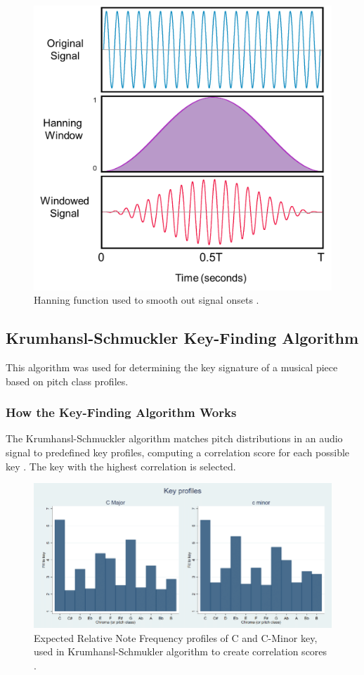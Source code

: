 \documentclass{article}
\begin{document}
\begin{figure}[H]
\includegraphics[width=\textwidth,scale=0.5]{images/hanning.png}
\caption{Hanning function used to smooth out signal onsets \cite{Siemens}.}
\end{figure}

\newpage

\subsection{Krumhansl-Schmuckler Key-Finding Algorithm}
This algorithm was used for determining the key signature of a musical piece based on pitch class profiles.

\subsubsection{How the Key-Finding Algorithm Works}
The Krumhansl-Schmuckler algorithm matches pitch distributions in an audio signal to predefined key profiles, computing a correlation score for each possible key \cite{krumhansl-schmuckler}. The key with the highest correlation is selected.

\begin{figure}[H]
\includegraphics[width=\textwidth,scale=0.5]{images/C-Cminor-Expected-Key-Profiles.png}
\caption{Expected Relative Note Frequency profiles of C and C-Minor key, used in Krumhansl-Schmukler algorithm to create correlation scores \cite{TonalStructure}.}
\end{figure}
\end{document}
